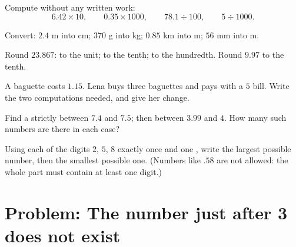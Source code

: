\begin{exercise}[$\star$]\label{exo:g6:decimals:7}
Compute without any written work:
\[
6.42 \times 10, \qquad
0.35 \times 1000, \qquad
78.1 \div 100, \qquad
5 \div 1000 .
\]
\end{exercise}

\begin{exercise}[$\star$]\label{exo:g6:decimals:8}
Convert: $2.4$ m into cm; \quad $370$ g into kg; \quad $0.85$ km into
m; \quad $56$ mm into m.
\end{exercise}

\begin{exercise}[$\star$]\label{exo:g6:decimals:9}
Round $23.867$: to the unit; to the tenth; to the hundredth. Round
$9.97$ to the tenth.
\end{exercise}

\begin{exercise}[$\star\star$]\label{exo:g6:decimals:10}
A baguette costs $1.15$. Lena buys three baguettes and pays with a
$5$ bill. Write the two computations needed, and give her change.
\end{exercise}

\begin{exercise}[$\star\star$]\label{exo:g6:decimals:11}
Find a  strictly between $7.4$ and $7.5$; then between
$3.99$ and $4$. How many such numbers are there in each case?
\end{exercise}

\begin{exercise}[$\star\star\star$]\label{exo:g6:decimals:12}
Using each of the digits $2$, $5$, $8$ exactly once and one , write the largest possible number, then the smallest possible
one. (Numbers like $.58$ are not allowed: the whole part must contain
at least one digit.)
\end{exercise}

\section{Problem: The number just after 3 does not exist}

